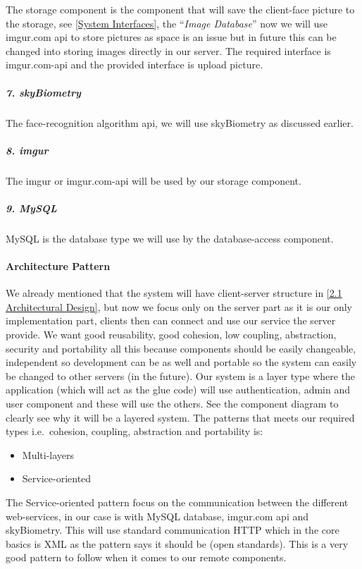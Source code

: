 \documentclass[a4paper,11pt]{article}
\begin{document}
The storage component is the component that will save the client-face
picture to the storage, see \ref{System Interfaces}, the ``\emph{Image Database}'' now we will use imgur.com api to store pictures
as space is an issue but in future this can be changed into storing
images directly in our server. The required interface is imgur.com-api
and the provided interface is upload picture.

\subparagraph{7. skyBiometry}\label{skybiometry}

The face-recognition algorithm api, we will use skyBiometry as discussed
earlier.

\subparagraph{8. imgur}\label{imgur}

The imgur or imgur.com-api will be used by our storage component.

\subparagraph{9. MySQL}\label{mysql}

MySQL is the database type we will use by the database-access component.

\paragraph{Architecture Pattern}\label{architecture-pattern}

We already mentioned that the system will have client-server structure in \ref{2.1 Architectural Design}, but now we focus only on the server part as it is our only implementation part, clients then can connect and use our service the server provide.
We want good reusability, good cohesion, low coupling, abstraction, security and
portability all this because components should be easily changeable,
independent so development can be as well and portable so the system can
easily be changed to other servers (in the future). Our system is a
layer type where the application (which will act as the glue code) will
use authentication, admin and user component and these will use the
others. See the component diagram to clearly see why it will be a
layered system. The patterns that meets our required types
i.e.~cohesion, coupling, abstraction and portability is:

\begin{itemize}
\item
  Multi-layers
\item
  Service-oriented
\end{itemize}

The Service-oriented pattern focus on the communication between the
different web-services, in our case is with MySQL database, imgur.com
api and skyBiometry. This will use standard communication HTTP which in
the core basics is XML as the pattern says it should be (open
standards). This is a very good pattern to follow when it comes to our
remote components.
\end{document}
